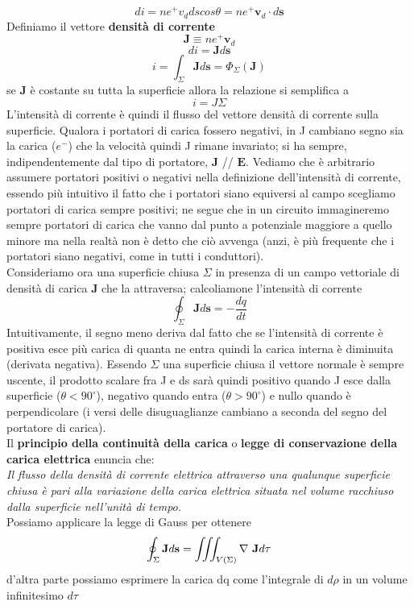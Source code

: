 \documentclass[
10pt, %
a4paper, %
oneside, %
headinclude,footinclude, %
BCOR5mm, %
]{scrartcl}
\begin{document}
\[di = n e^+ v_d ds cos\theta = n e^+ \mathbf{v}_d\cdot d\mathbf{s}\]
Definiamo il vettore \textbf{densità di corrente}
\[\mathbf{J} \equiv n e^+ \mathbf{v}_d\]
\[di = \mathbf{J}d\mathbf{s}\]
\[i = \int_{\Sigma} \mathbf{J}d\mathbf{s} = \Phi_\Sigma(\mathbf{J})\]
se \(\mathbf{J}\) è costante su tutta la superficie allora la relazione si semplifica a 
\[i = J\Sigma\]
L'intensità di corrente è quindi il flusso del vettore densità di corrente sulla superficie. Qualora i portatori di carica fossero negativi, in J cambiano segno sia la carica (\(e^-\)) che la velocità quindi J rimane invariato; si ha sempre, indipendentemente dal tipo di portatore, \(\mathbf{J}\) // $\mathbf{E}$. Vediamo che è arbitrario assumere portatori positivi o negativi nella definizione dell'intensità di corrente, essendo più intuitivo il fatto che i portatori siano equiversi al campo scegliamo portatori di carica sempre positivi; ne segue che in un circuito immagineremo sempre portatori di carica che vanno dal punto a potenziale maggiore a quello minore ma nella realtà non è detto che ciò avvenga (anzi, è più frequente che i portatori siano negativi, come in tutti i conduttori). \\
Consideriamo ora una superficie chiusa $\Sigma$ in presenza di un campo vettoriale di densità di carica $\mathbf{J}$ che la attraversa; calcoliamone l'intensità di corrente
\[\oint_\Sigma \mathbf{J}d\mathbf{s} = -\frac{dq}{dt}\]
Intuitivamente, il segno meno deriva dal fatto che se l'intensità di corrente è positiva esce più carica di quanta ne entra quindi la carica interna è diminuita (derivata negativa). Essendo $\Sigma$ una superficie chiusa il vettore normale è sempre uscente, il prodotto scalare fra J e ds sarà quindi positivo quando J esce dalla superficie ($\theta<90^\circ$), negativo quando entra ($\theta>90^\circ$) e nullo quando è perpendicolare (i versi delle disuguaglianze cambiano a seconda del segno del portatore di carica).\\
Il \textbf{principio della continuità della carica} o \textbf{legge di conservazione della carica elettrica} enuncia che:\\
\textit{Il flusso della densità di corrente elettrica attraverso una qualunque superficie chiusa è pari alla variazione della carica elettrica situata nel volume racchiuso dalla superficie nell'unità di tempo.}\\
Possiamo applicare la legge di Gauss per ottenere
\[\oint_\Sigma \mathbf{J}d\mathbf{s} = \iiint_{V(\Sigma)} \mathbf{\nabla\ }\mathbf{J} d\tau\]
d'altra parte possiamo esprimere la carica dq come l'integrale di \(d\rho\) in un volume infinitesimo \(d\tau\) 
\end{document}
